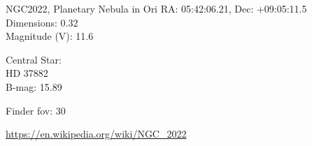 \begin{block}{NGC2022, Planetary Nebula in Ori}
    RA: 05:42:06.21, Dec: +09:05:11.5 \\ 
    Dimensions: 0.32 \\ 
    Magnitude (V): 11.6


    Central Star: \\ 
      \hspace{1em}HD 37882 \\ 
      \hspace{1em}B-mag: 15.89 


    Finder fov: 30 

    \url{https://en.wikipedia.org/wiki/NGC_2022} 
\end{block}